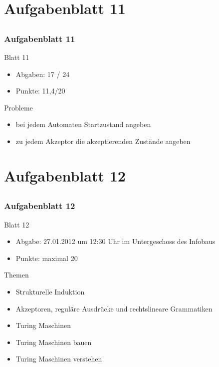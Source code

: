 

\section[Blatt 11]{Aufgabenblatt 11}
\subsection*{}
\begin{frame}
	\frametitle{Aufgabenblatt 11}
	\begin{block}{Blatt 11}
		\begin{itemize}
			\item Abgaben: 17 / 24
			\item Punkte: 11,4/20
		\end{itemize}
   \end{block}
	\begin{block}{Probleme}
 		\begin{itemize}
		   \item bei jedem Automaten Startzustand angeben \pause
		   \item zu jedem Akzeptor die akzeptierenden Zustände angeben
 	  \end{itemize}
	\end{block}
\end{frame}

\section[Blatt 12]{Aufgabenblatt 12}
\subsection*{}
\begin{frame}
	\frametitle{Aufgabenblatt 12}
	\begin{block}{Blatt 12}
		\begin{itemize}
			\item Abgabe: 27.01.2012 um 12:30 Uhr im Untergeschoss des Infobaus
			\item Punkte: maximal 20
		\end{itemize}
  	\end{block}
	\begin{block}{Themen}
		\begin{itemize}
	  		\item Strukturelle Induktion \pause
	  		\item Akzeptoren, reguläre Ausdrücke und rechtslineare Grammatiken \pause
	  		\item Turing Maschinen \pause
	  		\item Turing Maschinen bauen\pause 
	  		\item Turing Maschinen verstehen 
	 	\end{itemize}
	\end{block}
\end{frame}
